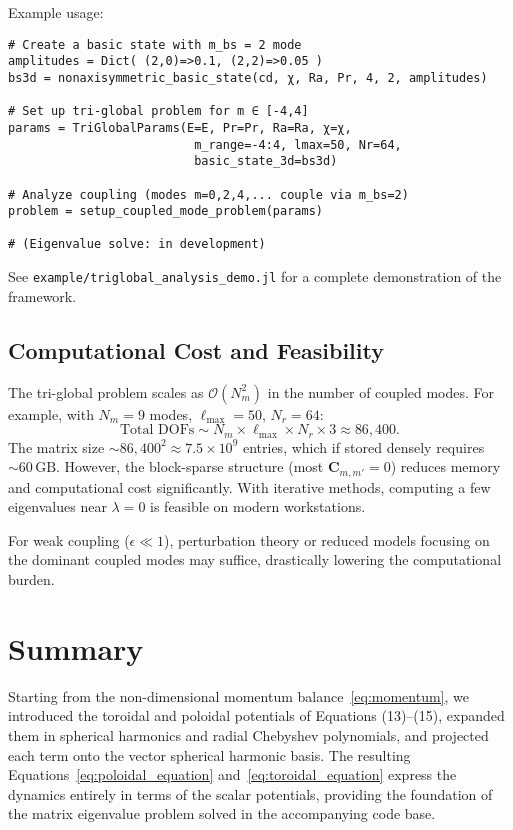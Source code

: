 \documentclass[11pt]{article}
\numberwithin{equation}{section}
\begin{document}
Example usage:
\begin{verbatim}
# Create a basic state with m_bs = 2 mode
amplitudes = Dict( (2,0)=>0.1, (2,2)=>0.05 )
bs3d = nonaxisymmetric_basic_state(cd, χ, Ra, Pr, 4, 2, amplitudes)

# Set up tri-global problem for m ∈ [-4,4]
params = TriGlobalParams(E=E, Pr=Pr, Ra=Ra, χ=χ,
                          m_range=-4:4, lmax=50, Nr=64,
                          basic_state_3d=bs3d)

# Analyze coupling (modes m=0,2,4,... couple via m_bs=2)
problem = setup_coupled_mode_problem(params)

# (Eigenvalue solve: in development)
\end{verbatim}

See \texttt{example/triglobal\_analysis\_demo.jl} for a complete demonstration of the framework.

\subsection{Computational Cost and Feasibility}

The tri-global problem scales as $\mathcal{O}(N_m^2)$ in the number of coupled modes. For example, with $N_m=9$ modes, $\ell_{\max}=50$, $N_r=64$:
\[
  \text{Total DOFs} \sim N_m \times \ell_{\max} \times N_r \times 3 \approx 86{,}400.
\]
The matrix size $\sim 86{,}400^2 \approx 7.5\times10^9$ entries, which if stored densely requires $\sim60\,\text{GB}$. However, the block-sparse structure (most $\bm{C}_{m,m'}=0$) reduces memory and computational cost significantly. With iterative methods, computing a few eigenvalues near $\lambda=0$ is feasible on modern workstations.

For weak coupling ($\epsilon \ll 1$), perturbation theory or reduced models focusing on the dominant coupled modes may suffice, drastically lowering the computational burden.

\section{Summary}
Starting from the non-dimensional momentum balance~\eqref{eq:momentum}, we introduced the toroidal and poloidal potentials of Equations (13)--(15), expanded them in spherical harmonics and radial Chebyshev polynomials, and projected each term onto the vector spherical harmonic basis. The resulting Equations~\eqref{eq:poloidal_equation} and~\eqref{eq:toroidal_equation} express the dynamics entirely in terms of the scalar potentials, providing the foundation of the matrix eigenvalue problem solved in the accompanying code base.
\end{document}
